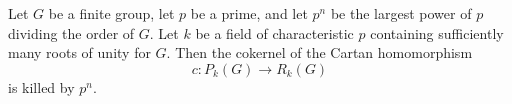 Let $G$ be a finite group, let $p$ be a prime, and let $p^n$ be the largest power of $p$ dividing the order of $G$. Let $k$ be a field of characteristic $p$ containing sufficiently many roots of unity for $G$. Then the cokernel of the Cartan homomorphism
$$
c: P_k(G) \to R_k(G)
$$
is killed by $p^n$.
